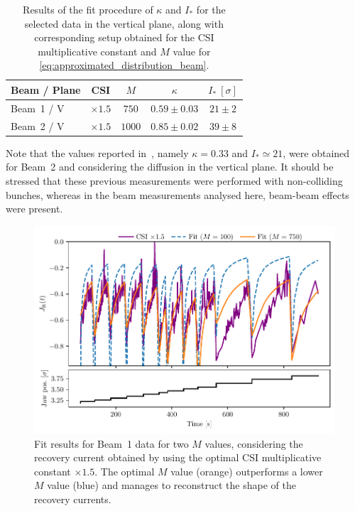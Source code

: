 %
\begin{table}[thp]
    \centering
    \begin{tabular}{lcccc}
        \toprule
        Beam / Plane & CSI & $M$ & $\kappa$ & $I_\ast\ [\sigma]$ \\
        \midrule
        Beam~1 / V & $\times1.5$ & $750$ & $0.59\pm0.03$ & $21\pm2$ \\
        Beam~2 / V & $\times1.5$ & $1000$ & $0.85\pm0.02$ & $39\pm8$ \\
        \bottomrule
    \end{tabular}
    \caption{Results of the fit procedure of $\kappa$ and $I_\ast$ for the selected data in the vertical plane, along with corresponding setup obtained for the CSI multiplicative constant and $M$ value for \eqref{eq:approximated_distribution_beam}.}
    \label{tab:fit_results}
\end{table}
%

Note that the values reported in~\cite{bazzani2020diffusion}, namely $\kappa=0.33 $ and $I_\ast \simeq 21$, were obtained for Beam~2 and considering the diffusion in the vertical plane. It should be stressed that these previous measurements were performed with non-colliding bunches, whereas in the beam measurements analysed here, beam-beam effects were present.

\begin{figure}[t]
    \centering
    \includegraphics[trim={0 2.5mm 0 3mm}, clip, width=1.0\textwidth]{5_Diffusion_measurement_LHC/figs/fifth.pdf}
    \caption{Fit results for Beam~1 data for two $M$ values, considering the recovery current obtained by using the optimal CSI multiplicative constant $\times 1.5$. The optimal $M$ value (orange) outperforms a lower $M$ value (blue) and manages to reconstruct the shape of the recovery currents.}
    \label{fig:fifth}
\end{figure}
%
